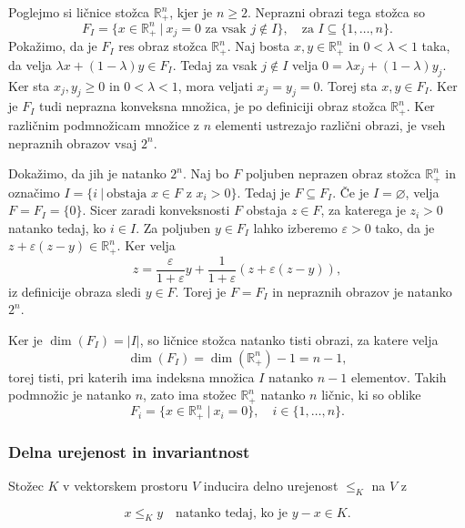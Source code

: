 \documentclass[mat2, tisk]{fmfdelo}
\begin{document}
\begin{zgled}\label{zgled2.20}
  Poglejmo si ličnice stožca $\mathbb{R}^n_+$, kjer je $n \geq 2$.
  Neprazni obrazi tega stožca so
  \[
  F_I = \{x \in \mathbb{R}^n_+ ~|~ x_j = 0
  \text{ za vsak } j \notin I\},
  \quad \text{za } I \subseteq \{1, \ldots, n\}.
  \]
  Pokažimo, da je $F_I$ res obraz stožca $\mathbb{R}^n_+$. Naj bosta
  $x,y\in\mathbb{R}^n_+$ in $0<\lambda<1$ taka, da velja
  $\lambda x+(1-\lambda)y\in F_I$. Tedaj za vsak $j\notin I$ velja
  $0=\lambda x_j+(1-\lambda)y_j$.
  Ker sta $x_j,y_j\geq0$ in $0<\lambda<1$, mora veljati
  $x_j=y_j=0$. Torej sta $x,y\in F_I$. Ker je $F_I$ tudi
  neprazna konveksna množica, je po definiciji obraz stožca
  $\mathbb{R}^n_+$.
  Ker različnim podmnožicam množice z $n$ elementi
  ustrezajo različni obrazi, je vseh nepraznih obrazov
  vsaj $2^n$.

  Dokažimo, da jih je natanko $2^n$. Naj bo $F$ poljuben neprazen obraz stožca $\mathbb R_+^n$
  in označimo $I=\{i ~|~ \text{obstaja }x\in F\text{ z }x_i>0\}$.
  Tedaj je $F\subseteq F_I$. Če je $I=\varnothing$, velja
  $F=F_I=\{0\}$. Sicer zaradi konveksnosti $F$ obstaja
  $z\in F$, za katerega je $z_i>0$ natanko tedaj, ko $i\in I$.
  Za poljuben $y\in F_I$ lahko izberemo $\varepsilon>0$ tako,
  da je $z+\varepsilon(z-y)\in\mathbb R_+^n$. Ker velja
  \[
  z=\frac{\varepsilon}{1+\varepsilon}y+
  \frac{1}{1+\varepsilon}(z+\varepsilon(z-y)),
  \]
  iz definicije obraza sledi $y\in F$. Torej je $F=F_I$ in nepraznih obrazov je natanko $2^n$.

  Ker je $\dim(F_I) = |I|$, so ličnice stožca
  natanko tisti obrazi, za katere velja
  \[
  \dim(F_I) = \dim(\mathbb{R}^n_+) - 1 = n - 1,
  \]
  torej tisti, pri katerih ima indeksna množica $I$
  natanko $n-1$ elementov. Takih podmnožic je natanko $n$,
  zato ima stožec $\mathbb{R}^n_+$ natanko $n$ ličnic,
  ki so oblike
  \[
  F_i = \{x \in \mathbb{R}^n_+ ~|~ x_i = 0\},
  \quad i \in \{1, \ldots, n\}.
  \]
\end{zgled}



\subsubsection{Delna urejenost in invariantnost}

Stožec $K$ v  vektorskem prostoru $V$ inducira delno urejenost \(\leq_K\) na \(V\) z

\[
x \leq_K y \quad \text{natanko tedaj, ko je } y - x \in K.
\]
\end{document}
